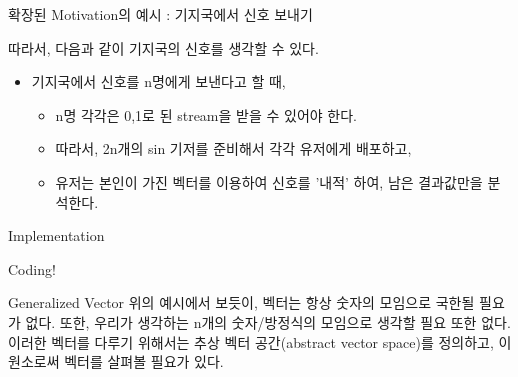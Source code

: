 \documentclass{beamer}
\begin{document}
\begin{frame}{확장된 Motivation의 예시 : 기지국에서 신호 보내기} 

따라서, 다음과 같이 기지국의 신호를 생각할 수 있다. 

\begin{itemize} 
\item 기지국에서 신호를 n명에게 보낸다고 할 때, 
\begin{itemize}
\item n명 각각은 0,1로 된 stream을 받을 수 있어야 한다. 
\item 따라서, 2n개의 sin 기저를 준비해서 각각 유저에게 배포하고, 
\item 유저는 본인이 가진 벡터를 이용하여 신호를 '내적' 하여, 남은 결과값만을 분석한다. 
\end{itemize}
\end{itemize}

\end{frame}



\begin{frame}{Implementation}

Coding! 

\end{frame}


\begin{frame}{Generalized Vector} 
위의 예시에서 보듯이, 벡터는 항상 숫자의 모임으로 국한될 필요가 없다. 또한, 우리가 생각하는 n개의 숫자/방정식의 모임으로 생각할 필요 또한 없다. 이러한 벡터를 다루기 위해서는 추상 벡터 공간(abstract vector space)를 정의하고, 이 원소로써 벡터를 살펴볼 필요가 있다. 
\end{frame}







\end{document}
